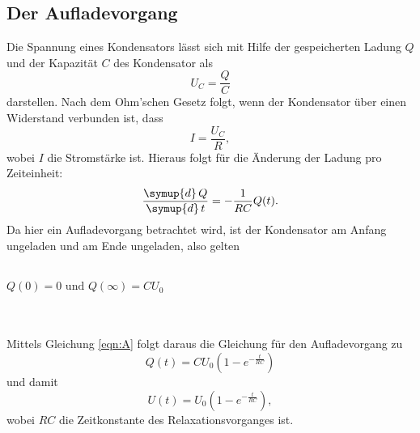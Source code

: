 \subsection{Der Aufladevorgang}
    Die Spannung eines Kondensators lässt sich mit Hilfe der gespeicherten Ladung $Q$ und der Kapazität $C$ des Kondensator als 
    \begin{equation}
        \label{eqn:UC}
        U_C = \frac{Q}{C}
    \end{equation}
    darstellen. Nach dem Ohm'schen Gesetz folgt, wenn der Kondensator über einen Widerstand verbunden ist, dass
    \begin{equation}
        \label{eqn:strom}
        I = \frac{U_C}{R},
    \end{equation}
    wobei $I$ die Stromstärke ist. Hieraus folgt für die Änderung der Ladung pro Zeiteinheit:
    \begin{equation}
        \label{eqn:ladung}
        \frac{\symup{d} \, Q}{\symup{d} \, t} = - \frac{1}{RC} Q(t).
    \end{equation}
    Da hier ein Aufladevorgang betrachtet wird, ist der Kondensator am Anfang ungeladen und am Ende ungeladen, also gelten
    \\ \\
    \centerline{$Q(0) = 0 \text{ und } Q(\infty)  = C U_0$}
    \\ \\
    Mittels Gleichung \eqref{eqn:A} folgt daraus die Gleichung für den Aufladevorgang zu
    \begin{equation}
        \label{eqn:aufladung}
        Q(t) = C U_0 (1 - e^{-\frac{t}{RC}} )
    \end{equation}
    und damit
    \begin{equation}
        \label{eqn:wunschformel}
        U(t) = U_0 (1 - e^{-\frac{t}{RC}} ),
    \end{equation}    
    wobei $RC$ die Zeitkonstante des Relaxationsvorganges ist.    
 
